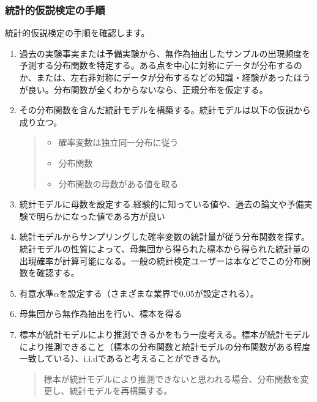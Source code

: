 \documentclass[a4paper,11pt,dvipdfmx]{jsarticle}
\begin{document}
\subsubsection{統計的仮説検定の手順}
統計的仮説検定の手順を確認します。
\begin{framed}
    \begin{enumerate}
        \item 過去の実験事実または予備実験から、無作為抽出したサンプルの出現頻度を予測する分布関数を特定する。ある点を中心に対称にデータが分布するのか、または、左右非対称にデータが分布するなどの知識・経験があったほうが良い。分布関数が全くわからないなら、正規分布を仮定する。
        \item その分布関数を含んだ統計モデルを構築する。統計モデルは以下の仮説から成り立つ。
        \begin{quote}
            \begin{itemize}
                \item 確率変数は独立同一分布に従う
                \item 分布関数
                \item 分布関数の母数がある値を取る
            \end{itemize}
        \end{quote}
        \item 統計モデルに母数を設定する.経験的に知っている値や、過去の論文や予備実験で明らかになった値である方が良い
        \item 統計モデルからサンプリングした確率変数の統計量が従う分布関数を探す。統計モデルの性質によって、母集団から得られた標本から得られた統計量の出現確率が計算可能になる。一般の統計検定ユーザーは本などでこの分布関数を確認する。
        \item 有意水準$\alpha$を設定する（さまざまな業界で$0.05$が設定される）。
        \item 母集団から無作為抽出を行い、標本を得る
        \item 標本が統計モデルにより推測できるかをもう一度考える。標本が統計モデルにより推測できること（標本の分布関数と統計モデルの分布関数がある程度一致している）、i.i.dであると考えることができるか。
        \begin{quote}
            標本が統計モデルにより推測できないと思われる場合、分布関数を変更し、統計モデルを再構築する。


\end{quote}
\end{enumerate}
\end{framed}
\end{document}
